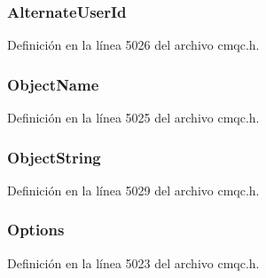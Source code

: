 \subsubsection[{Alternate\+User\+Id}]{ Alternate\+User\+Id}\label{structtag_m_q_s_d_aa4de0947b84fe1c303c8a5a419ef024a}


Definición en la línea 5026 del archivo cmqc.\+h.

\hypertarget{structtag_m_q_s_d_a2106fb125a9f7fc606340ba23c006bc0}{}
\subsubsection[{Object\+Name}]{ Object\+Name}\label{structtag_m_q_s_d_a2106fb125a9f7fc606340ba23c006bc0}


Definición en la línea 5025 del archivo cmqc.\+h.

\hypertarget{structtag_m_q_s_d_a564791473371222ceb856cfaf02d6f91}{}
\subsubsection[{Object\+String}]{ Object\+String}\label{structtag_m_q_s_d_a564791473371222ceb856cfaf02d6f91}


Definición en la línea 5029 del archivo cmqc.\+h.

\hypertarget{structtag_m_q_s_d_ad7aff2d6c6044809464380998d24ec5c}{}
\subsubsection[{Options}]{ Options}\label{structtag_m_q_s_d_ad7aff2d6c6044809464380998d24ec5c}


Definición en la línea 5023 del archivo cmqc.\+h.

\hypertarget{structtag_m_q_s_d_af93c638cce691abfce1562bb498b1c38}{}
